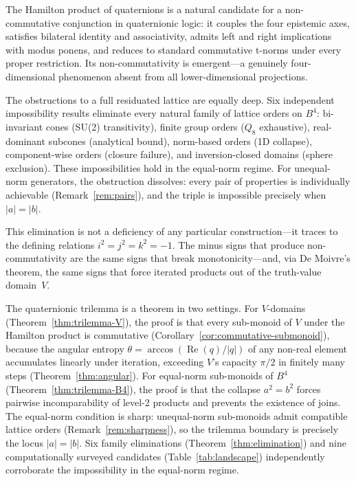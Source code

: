 \documentclass[11pt,a4paper]{article}
\newcommand{\Real}{\operatorname{Re}}
\begin{document}
The Hamilton product of quaternions is a natural candidate for a
non-commutative conjunction in quaternionic logic: it couples the four
epistemic axes, satisfies bilateral identity and associativity, admits
left and right implications with modus ponens, and reduces to standard
commutative t-norms under every proper restriction. Its
non-commutativity is emergent---a genuinely four-dimensional phenomenon
absent from all lower-dimensional projections.

The obstructions to a full residuated lattice are equally deep. Six
independent impossibility results eliminate every natural family of
lattice orders on $B^4$: bi-invariant cones (SU(2) transitivity),
finite group orders ($Q_8$ exhaustive), real-dominant subcones
(analytical bound), norm-based orders (1D collapse), component-wise
orders (closure failure), and inversion-closed domains (sphere
exclusion). These impossibilities hold in the equal-norm regime.
For unequal-norm generators, the obstruction dissolves: every pair
of properties is individually achievable (Remark~\ref{rem:pairs}),
and the triple is impossible precisely when $|a| = |b|$.

This elimination is not a deficiency of any particular
construction---it traces to the defining relations
$i^2 = j^2 = k^2 = -1$. The minus signs that produce
non-commutativity are the same signs that break monotonicity---and,
via De Moivre's theorem, the same signs that force iterated products
out of the truth-value domain~$V$.

The quaternionic trilemma is a theorem in two settings. For
$V$-domains (Theorem~\ref{thm:trilemma-V}), the proof is that every
sub-monoid of $V$ under the Hamilton product is commutative
(Corollary~\ref{cor:commutative-submonoid}), because the angular
entropy $\theta = \arccos(\Real(q)/|q|)$ of any non-real element
accumulates linearly under iteration, exceeding $V$'s capacity
$\pi/2$ in finitely many steps (Theorem~\ref{thm:angular}). For
equal-norm sub-monoids of $B^4$
(Theorem~\ref{thm:trilemma-B4}), the proof is that the collapse
$a^2 = b^2$ forces pairwise incomparability of level-2 products
and prevents the existence of joins. The equal-norm condition is
sharp: unequal-norm sub-monoids admit compatible lattice orders
(Remark~\ref{rem:sharpness}), so the trilemma boundary is
precisely the locus $|a| = |b|$. Six family eliminations
(Theorem~\ref{thm:elimination}) and nine computationally surveyed
candidates (Table~\ref{tab:landscape}) independently corroborate
the impossibility in the equal-norm regime.
\end{document}

